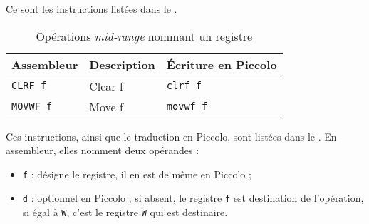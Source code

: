 


Ce sont les instructions listées dans le .



\begin{table}[!ht]
  \centering
  \small
  \begin{tabular}{lll}
    \textbf{Assembleur} & \textbf{Description} & \textbf{Écriture en Piccolo}\\
    \hline
    \texttt{CLRF f} & Clear f & \texttt{clrf f} \\
    \texttt{MOVWF f} & Move f & \texttt{movwf f} \\
  \hline
  \end{tabular}
  \caption{Opérations \emph{mid-range} nommant un registre}
\end{table}









Ces instructions, ainsi que le traduction en Piccolo, sont listées dans le . En assembleur, elles nomment deux opérandes :
\begin{itemize}
  \item \texttt{f} : désigne le registre, il en est de même en Piccolo ;
  \item \texttt{d} : optionnel en Piccolo ; si absent, le registre \texttt{f} est destination de l'opération, si égal à \texttt{W}, c'est le registre \texttt{W} qui est destinaire.
\end{itemize}


